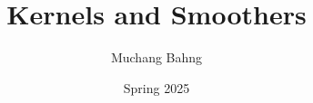 \documentclass{article}
\begin{document}
\title{Kernels and Smoothers}
\author{Muchang Bahng}
\date{Spring 2025}

\maketitle
\tableofcontents
\pagebreak














\end{document}
